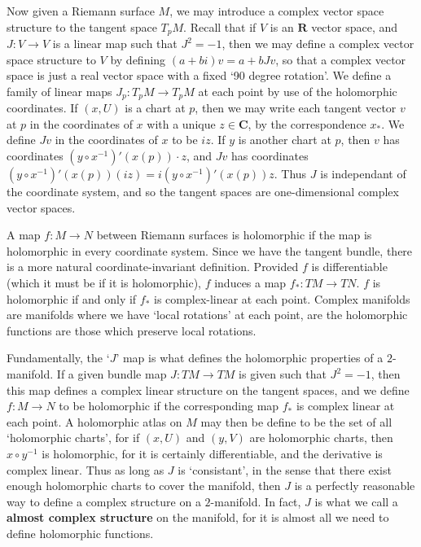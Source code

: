 Now given a Riemann surface $M$, we may introduce a complex vector space structure to the tangent space $T_p M$. Recall that if $V$ is an $\mathbf{R}$ vector space, and $J: V \to V$ is a linear map such that $J^2 = -1$, then we may define a complex vector space structure to $V$ by defining $(a + bi)v = a + bJv$, so that a complex vector space is just a real vector space with a fixed `90 degree rotation'. We define a family of linear maps $J_p: T_p M \to T_p M$ at each point by use of the holomorphic coordinates. If $(x,U)$ is a chart at $p$, then we may write each tangent vector $v$ at $p$ in the coordinates of $x$ with a unique $z \in \mathbf{C}$, by the correspondence $x_*$. We define $Jv$ in the coordinates of $x$ to be $iz$. If $y$ is another chart at $p$, then $v$ has coordinates $(y \circ x^{-1})'(x(p)) \cdot z$, and $Jv$ has coordinates $(y \circ x^{-1})'(x(p))(iz) = i(y \circ x^{-1})'(x(p)) z$. Thus $J$ is independant of the coordinate system, and so the tangent spaces are one-dimensional complex vector spaces.

A map $f: M \to N$ between Riemann surfaces is holomorphic if the map is holomorphic in every coordinate system. Since we have the tangent bundle, there is a more natural coordinate-invariant definition. Provided $f$ is differentiable (which it must be if it is holomorphic), $f$ induces a map $f_*: TM \to TN$. $f$ is holomorphic if and only if $f_*$ is complex-linear at each point. Complex manifolds are manifolds where we have `local rotations' at each point, are the holomorphic functions are those which preserve local rotations.

Fundamentally, the `$J$' map is what defines the holomorphic properties of a $2$-manifold. If a given bundle map $J:TM \to TM$ is given such that $J^2 = -1$, then this map defines a complex linear structure on the tangent spaces, and we define $f: M \to N$ to be holomorphic if the corresponding map $f_*$ is complex linear at each point. A holomorphic atlas on $M$ may then be define to be the set of all `holomorphic charts', for if $(x,U)$ and $(y,V)$ are holomorphic charts, then $x \circ y^{-1}$ is holomorphic, for it is certainly differentiable, and the derivative is complex linear. Thus as long as $J$ is `consistant', in the sense that there exist enough holomorphic charts to cover the manifold, then $J$ is a perfectly reasonable way to define a complex structure on a $2$-manifold. In fact, $J$ is what we call a {\bf almost complex structure} on the manifold, for it is almost all we need to define holomorphic functions.

